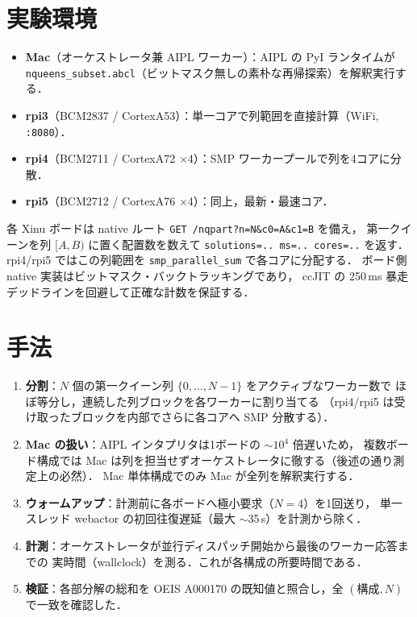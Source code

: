 \documentclass[11pt,a4paper]{article}
\begin{document}
\section{実験環境}
\begin{itemize}\setlength{\itemsep}{1pt}
\item \textbf{Mac}（オーケストレータ兼 AIPL ワーカー）：AIPL の Py\textendash I ランタイムが
\texttt{nqueens\_subset.abcl}（ビットマスク無しの素朴な再帰探索）を解釈実行する．
\item \textbf{rpi3}（BCM2837 / Cortex\textendash A53）：単一コアで列範囲を直接計算（WiFi, \texttt{:8080}）．
\item \textbf{rpi4}（BCM2711 / Cortex\textendash A72 $\times$4）：SMP ワーカープールで列を4コアに分散．
\item \textbf{rpi5}（BCM2712 / Cortex\textendash A76 $\times$4）：同上，最新・最速コア．
\end{itemize}
各 Xinu ボードは native ルート \texttt{GET /nqpart?n=N\&c0=A\&c1=B} を備え，
第一クイーンを列 $[A,B)$ に置く配置数を数えて
\texttt{solutions=..\ ms=..\ cores=..} を返す．
rpi4/rpi5 ではこの列範囲を \texttt{smp\_parallel\_sum} で各コアに分配する．
ボード側 native 実装はビットマスク・バックトラッキングであり，
cc\textendash JIT の 250\,ms 暴走デッドラインを回避して正確な計数を保証する．

\section{手法}
\begin{enumerate}\setlength{\itemsep}{1pt}
\item \textbf{分割}：$N$ 個の第一クイーン列 $\{0,\dots,N-1\}$ をアクティブなワーカー数で
ほぼ等分し，連続した列ブロックを各ワーカーに割り当てる
（rpi4/rpi5 は受け取ったブロックを内部でさらに各コアへ SMP 分散する）．
\item \textbf{Mac の扱い}：AIPL インタプリタは1ボードの $\sim10^4$ 倍遅いため，
複数ボード構成では Mac は列を担当せずオーケストレータに徹する（後述の通り測定上の必然）．
Mac 単体構成でのみ Mac が全列を解釈実行する．
\item \textbf{ウォームアップ}：計測前に各ボードへ極小要求（$N{=}4$）を1回送り，
単一スレッド webactor の初回往復遅延（最大 $\sim$35\,s）を計測から除く．
\item \textbf{計測}：オーケストレータが並行ディスパッチ開始から最後のワーカー応答までの
実時間（wall\textendash clock）を測る．これが各構成の所要時間である．
\item \textbf{検証}：各部分解の総和を OEIS A000170 の既知値と照合し，全 $(構成,N)$ で一致を確認した．
\end{enumerate}
\end{document}
